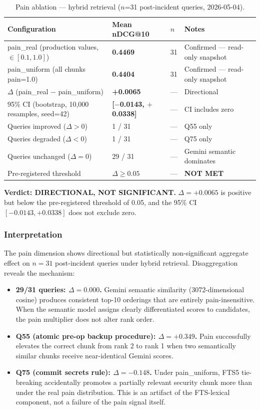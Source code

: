 \begin{table}[t]
  \caption{Pain ablation --- hybrid retrieval ($n$=31 post-incident queries, 2026-05-04).}
  \label{tab:painablation}
  \centering
  {\small
  \setlength{\tabcolsep}{4pt}
\begin{tabular}{llll}
    \toprule
    Configuration & Mean nDCG@10 & $n$ & Notes \\
    \midrule
    pain\_real (production values, $\in [0.1, 1.0]$) & \textbf{0.4469} & 31 & Confirmed --- read-only snapshot \\
    pain\_uniform (all chunks pain=1.0) & \textbf{0.4404} & 31 & Confirmed --- read-only snapshot \\
    $\Delta$ (pain\_real $-$ pain\_uniform) & \textbf{+0.0065} & --- & Directional \\
    95\% CI (bootstrap, 10,000 resamples, seed=42) & \textbf{[$-$0.0143, $+$0.0338]} & --- & CI includes zero \\
    Queries improved ($\Delta > 0$) & 1 / 31 & --- & Q55 only \\
    Queries degraded ($\Delta < 0$) & 1 / 31 & --- & Q75 only \\
    Queries unchanged ($\Delta = 0$) & 29 / 31 & --- & Gemini semantic dominates \\
    Pre-registered threshold & $\Delta \geq 0.05$ & --- & \textbf{NOT MET} \\
    \bottomrule
  \end{tabular}}
\end{table}

\textbf{Verdict: DIRECTIONAL, NOT SIGNIFICANT.} $\Delta = +0.0065$ is positive but below
the pre-registered threshold of 0.05, and the 95\% CI $[-0.0143, +0.0338]$ does not
exclude zero.

\subsubsection{Interpretation}

The pain dimension shows directional but statistically non-significant aggregate effect on
$n=31$ post-incident queries under hybrid retrieval. Disaggregation reveals the mechanism:

\begin{itemize}
  \item \textbf{29/31 queries: $\Delta = 0.000$.} Gemini semantic similarity (3072-dimensional
    cosine) produces consistent top-10 orderings that are entirely pain-insensitive. When
    the semantic model assigns clearly differentiated scores to candidates, the pain
    multiplier does not alter rank order.
  \item \textbf{Q55 (atomic pre-op backup procedure): $\Delta = +0.349$.} Pain successfully
    elevates the correct chunk from rank 2 to rank 1 when two semantically similar chunks
    receive near-identical Gemini scores.
  \item \textbf{Q75 (commit secrets rule): $\Delta = -0.148$.} Under pain\_uniform,
    FTS5 tie-breaking accidentally promotes a partially relevant security chunk more than
    under the real pain distribution. This is an artifact of the FTS-lexical component,
    not a failure of the pain signal itself.
\end{itemize}

